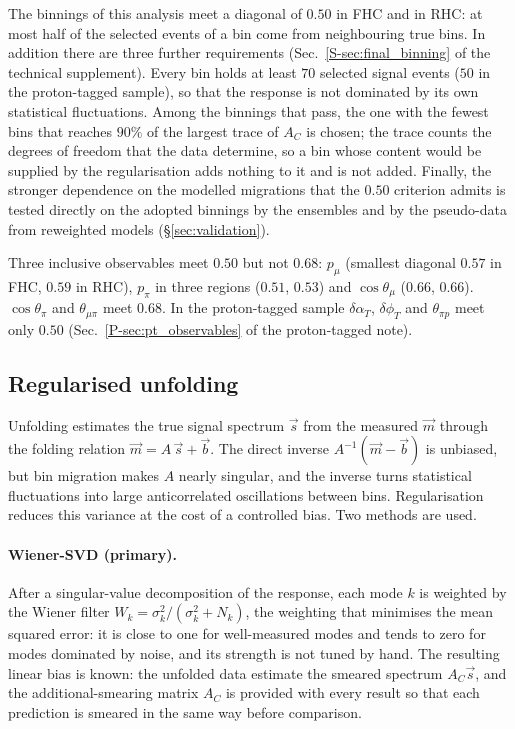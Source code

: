 \documentclass[11pt,a4paper]{article}
\newcommand{\suppref}[2]{#1~\ref{S-#2} of the technical supplement}
\newcommand{\ptref}[2]{#1~\ref{P-#2} of the proton-tagged note}
\begin{document}
The binnings of this analysis meet a diagonal of $0.50$ in FHC and in RHC: at most half of the selected
events of a bin come from neighbouring true bins. In addition there are three further requirements (\suppref{Sec.}{sec:final_binning}). Every bin holds at least $70$ selected  signal events ($50$ in
the proton-tagged sample), so that the response is not dominated by its own statistical fluctuations.
Among the binnings that pass, the one with the fewest bins that reaches $90\%$ of the largest trace of
$A_C$ is chosen; the trace counts the degrees of freedom that the data determine, so a bin whose
content would be supplied by the regularisation adds nothing to it and is not added. Finally, the
stronger dependence on the modelled migrations that the $0.50$ criterion admits is tested directly on
the adopted binnings by the ensembles and by the pseudo-data from reweighted models
(\S\ref{sec:validation}).

Three inclusive observables meet $0.50$ but not $0.68$: $p_\mu$ (smallest diagonal $0.57$ in FHC,
$0.59$ in RHC), $p_\pi$ in three regions ($0.51$, $0.53$) and $\cos\theta_\mu$ ($0.66$, $0.66$).
$\cos\theta_\pi$ and $\theta_{\mu\pi}$ meet $0.68$. In the proton-tagged sample $\delta\alpha_T$,
$\delta\phi_T$ and $\theta_{\pi p}$ meet only $0.50$ (\ptref{Sec.}{sec:pt_observables}).

\subsection{Regularised unfolding}
\label{sec:unfmethods}

Unfolding estimates the true signal spectrum $\vec{s}$ from the measured $\vec{m}$ through the
folding relation $\vec{m} = A\,\vec{s} + \vec{b}$. The direct inverse $A^{-1}(\vec{m}-\vec{b})$ is
unbiased, but bin migration makes $A$ nearly singular, and the inverse turns statistical
fluctuations into large anticorrelated oscillations between bins. Regularisation reduces this
variance at the cost of a controlled bias. Two methods are used.

\paragraph{Wiener-SVD (primary).} After a singular-value decomposition of the response, each mode
$k$ is weighted by the Wiener filter $W_k=\sigma_k^2/(\sigma_k^2+N_k)$, the weighting that minimises
the mean squared error: it is close to one for well-measured modes and tends to zero for modes
dominated by noise, and its strength is not tuned by hand. The resulting linear bias is known: the
unfolded data estimate the smeared spectrum $A_C\vec{s}$, and the additional-smearing matrix $A_C$
is provided with every result so that each prediction is smeared in the same way before
comparison.
\end{document}
